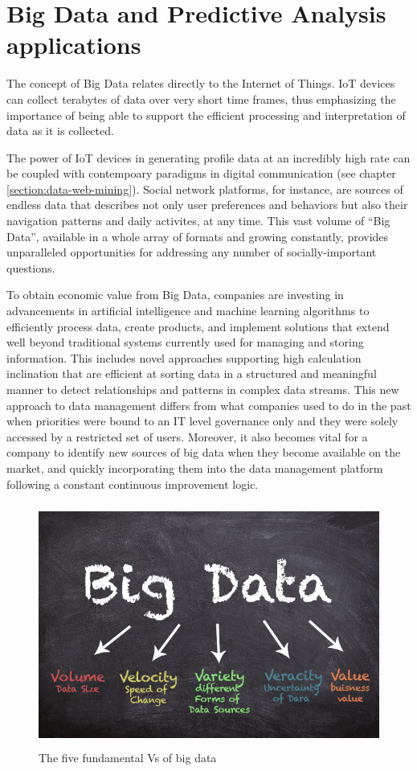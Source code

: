 \section{Big Data and Predictive Analysis applications}

The concept of Big Data relates directly to the Internet of Things. IoT devices can collect terabytes of data over very short time frames, thus emphasizing the importance of being able to support the efficient processing and interpretation of data as it is collected.

The power of IoT devices in generating profile data at an incredibly high rate can be coupled with contempoary paradigms in digital communication (see chapter \ref{section:data-web-mining}). Social network platforms, for instance, are sources of endless data that describes not only user preferences and behaviors but also their navigation patterns and daily activites, at any time. This vast volume of “Big Data”, available in a whole array of formats and growing constantly, provides unparalleled opportunities for addressing any number of socially-important questions.

To obtain economic value from Big Data, companies are investing in advancements in artificial intelligence and machine learning algorithms to efficiently process data, create products, and implement solutions that extend well beyond traditional systems currently used for managing and storing information. This includes novel approaches supporting high calculation inclination that are efficient at sorting data in a structured and meaningful manner to detect relationships and patterns in complex data streams. This new approach to data management differs from what companies used to do in the past when priorities were bound to an IT level governance only and they were solely accessed by a restricted set of users. Moreover, it also becomes vital for a company to identify new sources of big data when they become available on the market, and quickly incorporating them into the data management platform following a constant continuous improvement logic.

\vspace{0.5cm}
\begin{figure}[htbp]
  \centering
    \includegraphics[height=8cm]{images/bigdata.png}
  \caption{The five fundamental Vs of big data }
  \label{fig:bigdata}
\end{figure}
\vspace{0.5cm}

